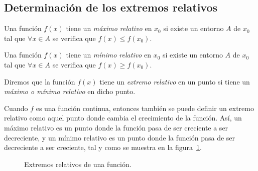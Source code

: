 \subsection{Determinación de los extremos relativos}
Una función $f(x)$ tiene un \emph{máximo relativo} en $x_0$ si
existe un entorno $A$ de $x_0$ tal que $\forall x \in A$ se verifica
que $f(x)\leq f(x_0)$.

Una función $f(x)$ tiene un \emph{mínimo relativo} en $x_0$ si
existe un entorno $A$ de $x_0$ tal que $\forall x\in A$ se verifica
que $f(x)\geq f(x_0)$.

Diremos que la función $f(x)$ tiene un \emph{extremo relativo} en un
punto si tiene un \emph{máximo o mínimo relativo} en dicho punto.

Cuando $f$ es una función continua, entonces también se puede
definir un extremo relativo como aquel punto donde cambia el
crecimiento de la función. Así, un máximo relativo es un punto donde
la función pasa de ser creciente a ser decreciente, y un mínimo
relativo es un punto donde la función pasa de ser decreciente a ser
creciente, tal y como se muestra en la figura~\ref{g:extremos_derivada}.

\begin{figure}[h!]
\centering {}\qquad
{}
\caption{Extremos relativos de una función.}
\label{g:extremos_derivada}
\end{figure}

